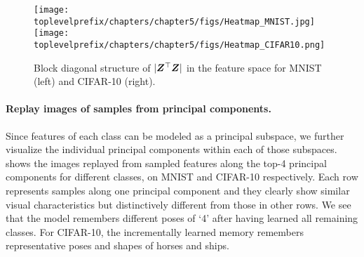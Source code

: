 \documentclass[../../book-main.tex]{subfiles}
\begin{document}
\begin{figure}[tb]
\centering
\texttt{[image: \\toplevelprefix/chapters/chapter5/figs/Heatmap\_MNIST.jpg]}  
\texttt{[image: \\toplevelprefix/chapters/chapter5/figs/Heatmap\_CIFAR10.png]}
\caption{\small Block diagonal structure of $|\bm{Z}^\top \bm{Z}|$ in the feature space for MNIST (left) and CIFAR-10 (right).}
\label{fig:cifar_10_pca_sampling_main}
\end{figure}



\paragraph{Replay images of samples from principal components.}
Since features of each class can be modeled as a principal subspace, we further visualize the individual principal components within each of those subspaces.  shows the images replayed from sampled features along the top-4 principal components for different classes, on MNIST and CIFAR-10 respectively. Each row represents samples along one principal component and they clearly show similar visual characteristics but distinctively different from those in other rows. We see that the model remembers different poses of `4' after having learned all remaining classes. For CIFAR-10, the incrementally learned memory remembers representative poses and shapes of horses and ships. 
\end{document}
